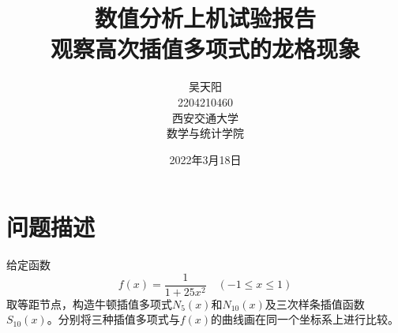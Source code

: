 \documentclass[12pt, a4paper, oneside]{ctexart}
\newcommand{\xiaosihao}{\fontsize{12pt}{\baselineskip}\selectfont}
\begin{document}
\newtheorem{example}{例}             %
\newtheorem{algorithm}{算法}
\newtheorem{theorem}{定理}[section]  %
\newtheorem{definition}{定义}
\newtheorem{axiom}{公理}
\newtheorem{property}{性质}
\newtheorem{proposition}{命题}
\newtheorem{lemma}{引理}
\newtheorem{corollary}{推论}
\newtheorem{remark}{注解}
\newtheorem{condition}{条件}
\newtheorem{conclusion}{结论}
\newtheorem{assumption}{假设}

\renewcommand{\contentsname}{目录}  %
\renewcommand{\abstractname}{摘要}  %
\renewcommand{\refname}{参考文献}   %
\renewcommand{\indexname}{索引}
\renewcommand{\figurename}{图}
\renewcommand{\tablename}{表}
\renewcommand{\appendixname}{附录}
\renewcommand{\algorithm}{算法}


\title{数值分析上机试验报告\\观察高次插值多项式的龙格现象}
\author{吴天阳\\2204210460\\[2ex]
\xiaosihao 西安交通大学\\ \xiaosihao 数学与统计学院\\[2ex]
}
\date{2022年3月18日}

\maketitle %
\newpage
\tableofcontents %

\newpage
\section{问题描述}
给定函数
\begin{equation*}
 f(x) = \dfrac{1}{1+25x^2}\quad (-1\leqslant x\leqslant 1)   
\end{equation*}
取等距节点，构造牛顿插值多项式$N_5(x)$和$N_{10}(x)$及三次样条插值函数$S_{10}(x)$。分别将三种插值多项式与$f(x)$的曲线画在同一个坐标系上进行比较。
\end{document}
